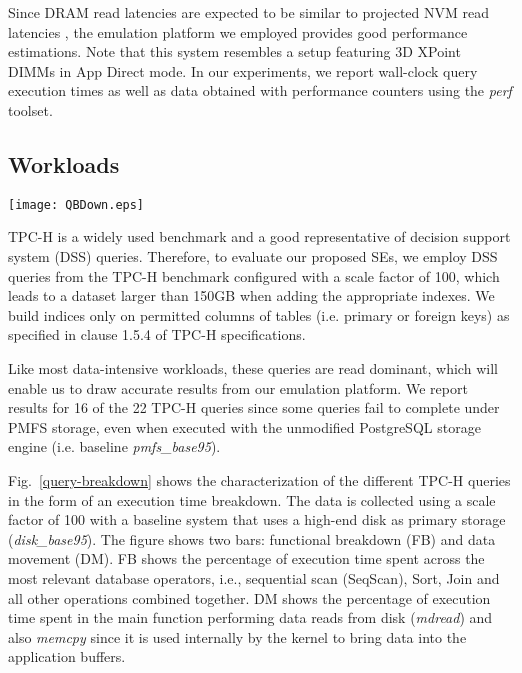 
Since DRAM read latencies are expected to be similar to projected NVM read latencies \cite{mittal2016survey,arulraj2015let,wang2013low,chang2012limits}, the emulation platform we employed provides good performance estimations. Note that this system resembles a setup featuring 3D XPoint DIMMs in App Direct mode. In our experiments, we report wall-clock query execution times as well as data obtained with performance counters using the \textit{perf} toolset.


\subsection{Workloads}

\begin{figure*}
\centering
\texttt{[image: QBDown.eps]}
\caption{Execution time breakdown for TPCH queries in traditional DBMS with database stored in disk-storage}
\label{query-breakdown}
\end{figure*}

TPC-H \cite{council2008tpc} is a widely used benchmark and a good representative of decision support system
(DSS) queries. Therefore, to evaluate our proposed SEs, we employ DSS queries from the TPC-H benchmark configured with a scale factor of 100, which leads to a dataset larger than 150GB when adding the appropriate
indexes. We build indices only on permitted columns of tables (i.e. primary or foreign keys) as specified in clause 1.5.4 of TPC-H specifications.

Like most data-intensive workloads, these queries are read dominant, which will enable us to draw accurate results from our emulation platform. We report results for 16 of the 22 TPC-H queries since some queries fail to complete under PMFS storage, even when executed with the unmodified PostgreSQL storage engine (i.e. baseline \textit{pmfs\_base95}).

Fig.~\ref{query-breakdown} shows the characterization of the different TPC-H queries in the form of an execution 
time breakdown. The data is collected using a scale factor of 100 with a baseline system that uses a high-end disk as primary storage 
(\textit{disk\_base95}).  The  figure shows two bars: 
functional breakdown (FB) and data movement (DM). FB shows 
the percentage of execution 
time spent across the most relevant database operators, i.e., sequential scan (SeqScan), Sort, Join and all other operations
combined together. DM shows the percentage of execution time spent in the main function performing data reads from 
disk (\textit{mdread}) and also \textit{memcpy} since it is used internally by the kernel to bring data into the application buffers.

